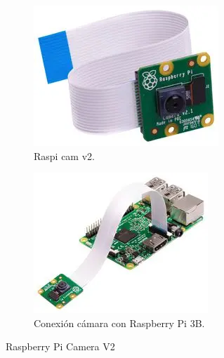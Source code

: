 \documentclass[11pt,a4paper]{article}
\begin{document}
	\begin{figure}[h!]
		\centering
		\begin{subfigure}{0.4\textwidth}
			\includegraphics[width=\textwidth]{imagenes/raspi_cam.png}
			\caption{Raspi cam v2.}
		\end{subfigure}
		\hfill
		\begin{subfigure}{0.5\textwidth}
			\centering
			\includegraphics[width=\textwidth]{imagenes/raspi_cam2.png}
			\caption{Conexión cámara con Raspberry Pi 3B.}	
		\end{subfigure}
		
		\caption{Raspberry Pi Camera V2}
		\label{fig:raspi cam}
	\end{figure}
	
\end{document}

